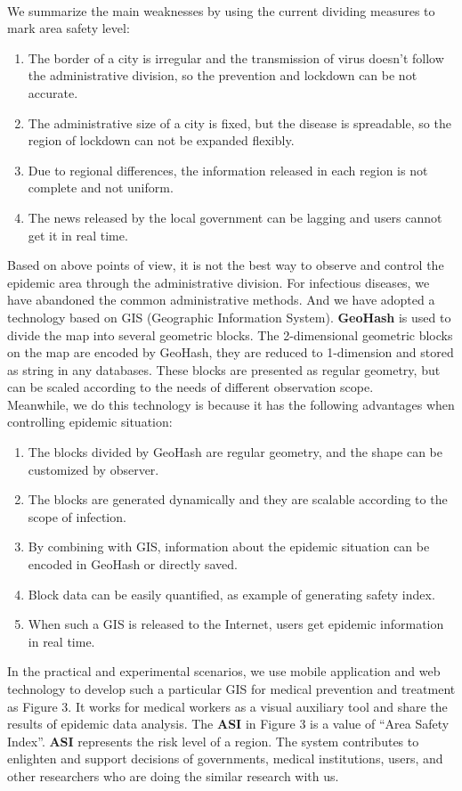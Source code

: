 \documentclass[sigplan,screen]{acmart}
\begin{document}
\\
We summarize the main weaknesses by using the current dividing measures to mark area safety level:
\begin{enumerate}
	\item The border of a city is irregular and the transmission of virus doesn't follow the administrative division, so the prevention and lockdown can be not accurate.
	\item The administrative size of a city is fixed, but the disease is spreadable, so the region of lockdown can not be expanded flexibly.
	\item Due to regional differences, the information released in each region is not complete and not uniform.
	\item The news released by the local government can be lagging and users cannot get it in real time.
\end{enumerate}
Based on above points of view, it is not the best way to observe and control the epidemic area through the administrative division.
For infectious diseases, we have abandoned the common administrative methods. And we have adopted a technology based on GIS (Geographic Information System)\cite{clarke1986advances}. \textbf{GeoHash} is used to divide the map into several geometric blocks. The 2-dimensional geometric blocks on the map are encoded by GeoHash, they are reduced to 1-dimension and stored as string in any databases. These blocks are presented as regular geometry, but can be scaled according to the needs of different observation scope.
\\
Meanwhile, we do this technology is because it has the following advantages when controlling epidemic situation:
\begin{enumerate}
	\item The blocks divided by GeoHash are regular geometry, and the shape can be customized by observer.
	\item The blocks are generated dynamically and they are scalable according to the scope of infection.
	\item By combining with GIS, information about the epidemic situation can be encoded in GeoHash or directly saved.
	\item Block data can be easily quantified, as example of generating safety index.
	\item When such a GIS is released to the Internet, users get epidemic information in real time.
\end{enumerate}
In the practical and experimental scenarios, we use mobile application and web technology to develop such a particular GIS for medical prevention and treatment as Figure 3. It works for medical workers as a visual auxiliary tool and share the results of epidemic data analysis. The \textbf{ASI} in Figure 3 is a value of ``Area Safety Index''. \textbf{ASI} represents the risk level of a region. The system contributes to enlighten and support decisions of governments, medical institutions, users, and other researchers who are doing the similar research with us.
\end{document}
